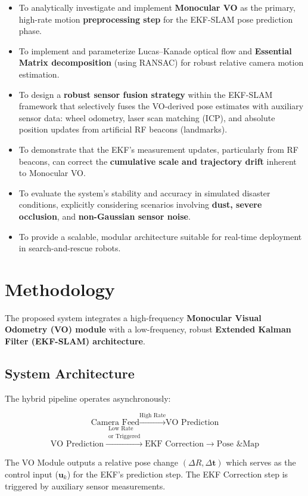 \documentclass[conference]{IEEEtran}
\begin{document}
\begin{itemize}
    \item To analytically investigate and implement \textbf{Monocular VO} as the primary, high-rate motion \textbf{preprocessing step} for the EKF-SLAM pose prediction phase.
    \item To implement and parameterize Lucas–Kanade optical flow and \textbf{Essential Matrix decomposition} (using RANSAC) for robust relative camera motion estimation.
    \item To design a \textbf{robust sensor fusion strategy} within the EKF-SLAM framework that selectively fuses the VO-derived pose estimates with auxiliary sensor data: wheel odometry, laser scan matching (ICP), and absolute position updates from artificial RF beacons (landmarks).
    \item To demonstrate that the EKF's measurement updates, particularly from RF beacons, can correct the \textbf{cumulative scale and trajectory drift} inherent to Monocular VO.
    \item To evaluate the system's stability and accuracy in simulated disaster conditions, explicitly considering scenarios involving \textbf{dust, severe occlusion}, and \textbf{non-Gaussian sensor noise}.
    \item To provide a scalable, modular architecture suitable for real-time deployment in search-and-rescue robots.
\end{itemize}

\section{Methodology}

The proposed system integrates a high-frequency \textbf{Monocular Visual Odometry (VO) module} with a low-frequency, robust \textbf{Extended Kalman Filter (EKF-SLAM) architecture}.

\subsection{System Architecture}
The hybrid pipeline operates asynchronously:

$$
\text{Camera Feed} \xrightarrow{\text{High Rate}} \text{VO Prediction}
$$
$$
\text{VO Prediction} \xrightarrow{\substack{\text{Low Rate} \\ \text{or Triggered}}} \text{EKF Correction} \rightarrow \text{Pose \& Map}
$$

The VO Module outputs a relative pose change $(\Delta R, \Delta \mathbf{t})$ which serves as the control input ($\mathbf{u}_k$) for the EKF's prediction step. The EKF Correction step is triggered by auxiliary sensor measurements.
\end{document}
